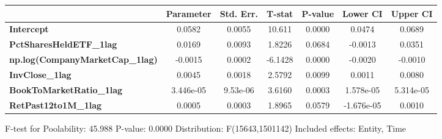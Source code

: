 \begin{center}
\begin{tabular}{lclc}
\bottomrule
\end{tabular}
\begin{tabular}{lcccccc}
                                        & \textbf{Parameter} & \textbf{Std. Err.} & \textbf{T-stat} & \textbf{P-value} & \textbf{Lower CI} & \textbf{Upper CI}  \\
\midrule
\textbf{Intercept}                      &       0.0582       &       0.0055       &      10.611     &      0.0000      &       0.0474      &       0.0689       \\
\textbf{PctSharesHeldETF\_1lag}         &       0.0169       &       0.0093       &      1.8226     &      0.0684      &      -0.0013      &       0.0351       \\
\textbf{np.log(CompanyMarketCap\_1lag)} &      -0.0015       &       0.0002       &     -6.1428     &      0.0000      &      -0.0020      &      -0.0010       \\
\textbf{InvClose\_1lag}                 &       0.0045       &       0.0018       &      2.5792     &      0.0099      &       0.0011      &       0.0080       \\
\textbf{BookToMarketRatio\_1lag}        &     3.446e-05      &      9.53e-06      &      3.6160     &      0.0003      &     1.578e-05     &     5.314e-05      \\
\textbf{RetPast12to1M\_1lag}            &       0.0005       &       0.0003       &      1.8965     &      0.0579      &     -1.676e-05    &       0.0010       \\
\bottomrule
\end{tabular}
\end{center}

F-test for Poolability: 45.988 \newline
 P-value: 0.0000 \newline
 Distribution: F(15643,1501142) \newline
  \newline
 Included effects: Entity, Time